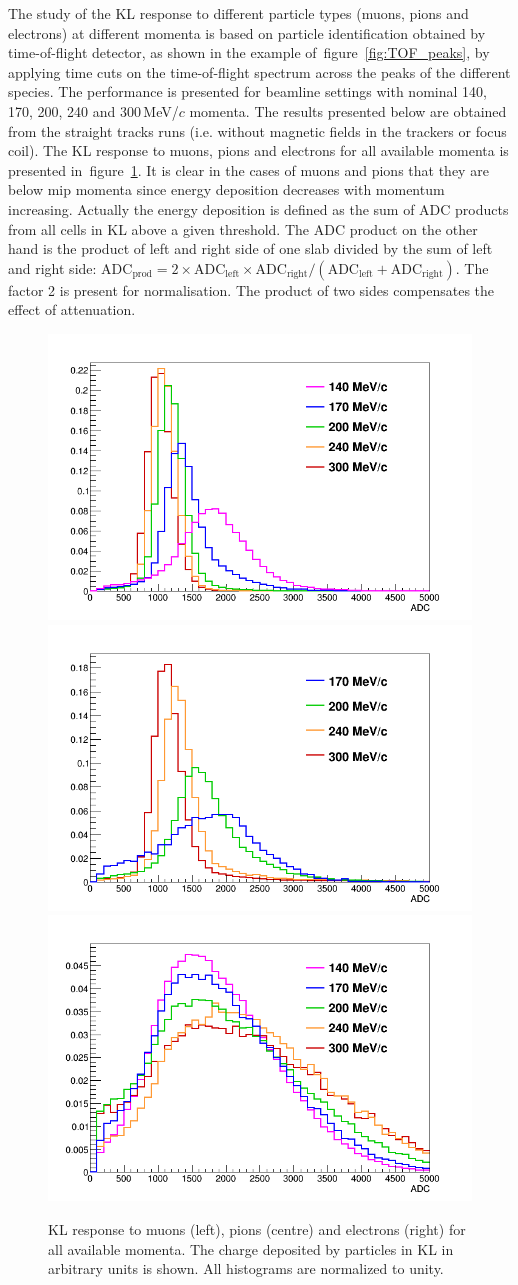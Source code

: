 The study of the KL response to different particle types (muons, pions and electrons) at different momenta is based on particle identification obtained by time-of-flight detector, as shown in the example of~figure~\ref{fig:TOF_peaks}, by applying time cuts on the time-of-flight spectrum across the peaks of the different species. The performance is presented for beamline settings with nominal 140, 170, 200, 240 and 300\,MeV/$c$ momenta. The results presented below are obtained from the straight tracks runs (i.e. without magnetic fields in the trackers or focus coil). The KL response to muons, pions and electrons for all available momenta is presented in~figure~\ref{fig:KL3}. It is clear in the cases of muons and pions that they are below mip momenta since energy deposition decreases with momentum increasing. Actually the energy deposition is defined as the sum of ADC products from all cells in KL above a given threshold. The ADC product on the other hand is the product of left and right side of one slab divided by the sum of left and right side: $\text{ADC}_{\text{prod}} = 2 \times \text{ADC}_{\text{left}} \times \text{ADC}_{\text{right}} / (\text{ADC}_{\text{left}} + \text{ADC}_{\text{right}})$. The factor 2 is present for normalisation. The product of two sides compensates the effect of attenuation.
  \begin{figure}
	\begin{center}
  		\includegraphics[width=0.32\columnwidth]{./04-KL/Figures/muon.png}
  		\includegraphics[width=0.32\columnwidth]{./04-KL/Figures/pion.png}
  		\includegraphics[width=0.32\columnwidth]{./04-KL/Figures/electron.png}
  		\caption{KL response to muons (left), pions (centre) and electrons (right) for all available momenta. The charge deposited by particles in KL in arbitrary units is shown. All histograms are normalized to unity.}
  		\label{fig:KL3}
  	\end{center}
  \end{figure}
  
